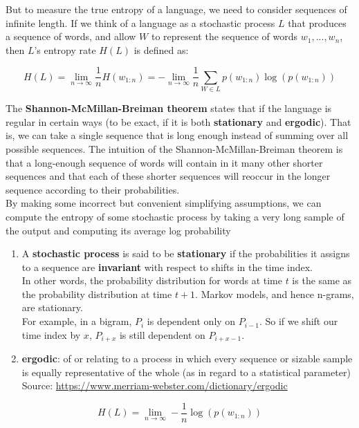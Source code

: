 But to measure the true entropy of a language, we need to consider sequences of infinite length. If we think of a language as a stochastic process $L$ that produces a sequence of words, and allow $W$ to represent the sequence of words $w_1,...,w_n$, then $L$’s entropy rate $H(L)$ is defined as:

\[
    H(L) = \lim_{n \rightarrow \infty} \dfrac{1}{n}H(w_{1:n}) = -\lim_{n \rightarrow \infty} \dfrac{1}{n}\sum_{W \in L} p(w_{1:n})\log(p(w_{1:n}))
\]

The \textbf{Shannon-McMillan-Breiman theorem} states that if the language is regular in certain ways (to be exact, if it is both \textbf{stationary} and \textbf{ergodic}). That is, we can take a single sequence that is long enough instead of summing over all possible sequences. The intuition of the Shannon-McMillan-Breiman theorem is that a long-enough sequence of words will contain in it many other shorter sequences and that each of these shorter sequences will reoccur in the longer sequence according to their probabilities.\\By making some incorrect but convenient simplifying assumptions, we can compute the entropy of some stochastic process by taking a very long sample of the output and computing its average log probability

\begin{enumerate}
    \item A \textbf{stochastic process} is said to be \textbf{stationary} if the probabilities it assigns to a sequence are \textbf{invariant} with respect to shifts in the time index.\\ In other words, the probability distribution for words at time $t$ is the same as the probability distribution at time $t + 1$. Markov models, and hence n-grams, are stationary.\\ For example, in a bigram, $P_i$ is dependent only on $P_{i-1}$. So if we shift our time index by $x$, $P_{i+x}$ is still dependent on $P_{i+x-1}$.
    \item \textbf{ergodic}: of or relating to a process in which every sequence or sizable sample is equally representative of the whole (as in regard to a statistical parameter)\\
    Source: \href{https://www.merriam-webster.com/dictionary/ergodic}{https://www.merriam-webster.com/dictionary/ergodic}
\end{enumerate}

\[
    H(L) = \lim_{n \rightarrow \infty} -\dfrac{1}{n} \log(p(w_{1:n}))
\]


